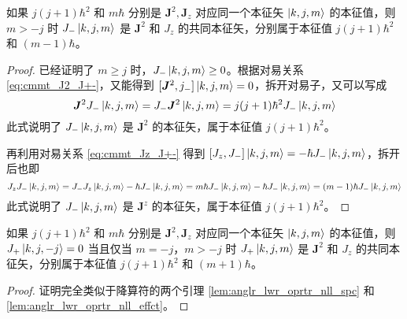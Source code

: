 \documentclass[cn,10pt,math=newtx,citestyle=gb7714-2015,bibstyle=gb7714-2015]{elegantbook}
\def\bm{\boldsymbol}
\begin{document}
\begin{lemma}[降算符的作用]\label{lem:anglr_lwr_oprtr_nll_effct}
    如果 $j(j+1)\hbar^2$ 和 $m\hbar$ 分别是 $\bm J^2,\bm J_z$ 对应同一个本征矢 $\ket{k,j,m}$ 的本征值，则 $m>-j$ 时 $J_-\ket{k,j,m}$ 是 $\bm J^2$ 和 $J_z$ 的共同本征矢，分别属于本征值 $j(j+1)\hbar^2$ 和 $(m-1)\hbar$。
\end{lemma}
\begin{proof}
    已经证明了 $m\ge j$ 时，$J_-\ket{k,j,m}\ge 0$。根据对易关系 \ref{eq:cmmt_J2_J+-}，又能得到 $[\bm J^2,j_-]\ket{k,j,m}=0$，拆开对易子，又可以写成
    \begin{equation}
        \bm J^2 J_-\ket{k,j,m} = J_-\bm J^2\ket{k,j,m} = j(j+1)\hbar^2 J_-\ket{k,j,m}
    \end{equation}
    此式说明了 $J_-\ket{k,j,m}$ 是 $\bm J^2$ 的本征矢，属于本征值 $j(j+1)\hbar^2$。
    
    再利用对易关系 \ref{eq:cmmt_Jz_J+-} 得到 $[J_z,J_-]\ket{k,j,m} = -\hbar J_-\ket{k,j,m}$，拆开后也即
    \begin{equation}
        J_zJ_-\ket{k,j,m} = J_-J_z\ket{k,j,m} - \hbar J_-\ket{k,j,m} = m\hbar J_-\ket{k,j,m} -\hbar J_-\ket{k,j,m} = (m-1)\hbar J_-\ket{k,j,m}
    \end{equation}
    此式说明了 $J_-\ket{k,j,m}$ 是 $\bm J^z$ 的本征矢，属于本征值 $j(j+1)\hbar^2$。
\end{proof}

\begin{lemma}[升算符的零空间及其作用]
    如果 $j(j+1)\hbar^2$ 和 $m\hbar$ 分别是 $\bm J^2,\bm J_z$ 对应同一个本征矢 $\ket{k,j,m}$ 的本征值，则 $J_+\ket{k,j,-j} = 0$ 当且仅当 $m=-j$，$m>-j$ 时 $J_+\ket{k,j,m}$ 是 $\bm J^2$ 和 $J_z$ 的共同本征矢，分别属于本征值 $j(j+1)\hbar^2$ 和 $(m+1)\hbar$。
\end{lemma}
\begin{proof}
    证明完全类似于降算符的两个引理 \ref{lem:anglr_lwr_oprtr_nll_spc} 和 \ref{lem:anglr_lwr_oprtr_nll_effct}。
\end{proof}
\end{document}
